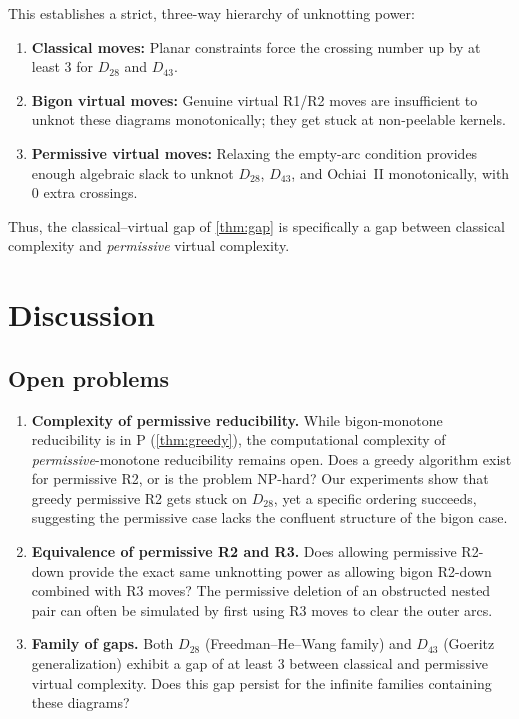 \documentclass[a4paper,UKenglish,cleveref,autoref]{lipics-v2021}
\begin{document}
This establishes a strict, three-way hierarchy of unknotting power:
\begin{enumerate}
\item \textbf{Classical moves:} Planar constraints force the crossing number up by at least $3$ for $D_{28}$ and $D_{43}$.
\item \textbf{Bigon virtual moves:} Genuine virtual R1/R2 moves are insufficient to unknot these diagrams monotonically; they get stuck at non-peelable kernels.
\item \textbf{Permissive virtual moves:} Relaxing the empty-arc condition provides enough algebraic slack to unknot $D_{28}$, $D_{43}$, and Ochiai~II monotonically, with $0$ extra crossings.
\end{enumerate}

Thus, the classical--virtual gap of \cref{thm:gap} is specifically a gap between classical complexity and \emph{permissive} virtual complexity.

\section{Discussion}

\subsection{Open problems}

\begin{enumerate}
\item \textbf{Complexity of permissive reducibility.}
While bigon-monotone reducibility is in P (\cref{thm:greedy}), the computational complexity of \emph{permissive}-monotone reducibility remains open.
Does a greedy algorithm exist for permissive R2, or is the problem NP-hard?
Our experiments show that greedy permissive R2 gets stuck on $D_{28}$, yet a specific ordering succeeds, suggesting the permissive case lacks the confluent structure of the bigon case.

\item \textbf{Equivalence of permissive R2 and R3.}
Does allowing permissive R2-down provide the exact same unknotting power as allowing bigon R2-down combined with R3 moves?
The permissive deletion of an obstructed nested pair can often be simulated by first using R3 moves to clear the outer arcs.

\item \textbf{Family of gaps.}
Both $D_{28}$ (Freedman--He--Wang family) and $D_{43}$ (Goeritz generalization) exhibit a gap of at least $3$ between classical and permissive virtual complexity.
Does this gap persist for the infinite families containing these diagrams?
\end{enumerate}
\end{document}
